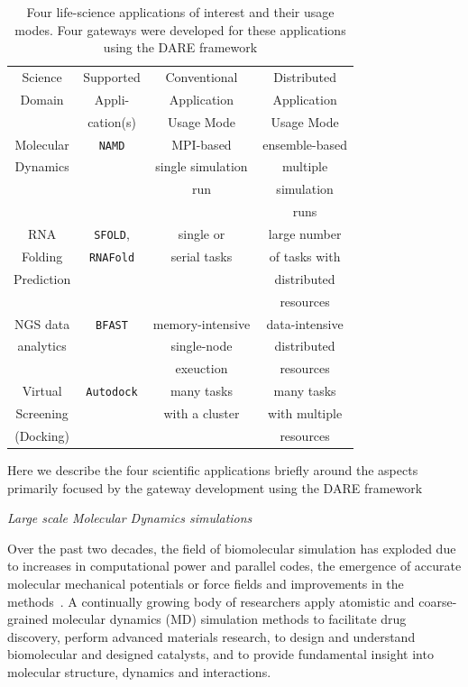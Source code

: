 \documentclass{sig-alternate}
\begin{document}
\begin{table}
 \small
\begin{tabular}{|c|c|c|c|} 
  \hline Science  & Supported  & Conventional   &   Distributed
  \\
  Domain & Appli- & Application & Application \\ 
  &  cation(s) & Usage Mode & Usage Mode \\  \hline \hline 
  
  Molecular   &  \texttt{NAMD} &  MPI-based  & ensemble-based   \\
   Dynamics  &  & single simulation  & multiple  \\ 
   &  & run &  simulation  \\ 
   &  &  &  runs \\ \hline
  RNA   & \texttt{SFOLD}, & single or   & large number  \\
  Folding   & \texttt{RNAFold} & serial tasks & of tasks with   \\
  Prediction & &  &distributed \\
  &  &  &   resources  \\ \hline
  NGS data     &  \texttt{BFAST} & memory-intensive  & data-intensive\\ 
     analytics  &  &  single-node   &  distributed  \\
     & & exeuction  & resources \\ \hline
  Virtual  & \texttt{Autodock} &  many tasks   & many tasks \\
   Screening  &  & with a cluster  & with multiple  \\
    (Docking) &  &  & resources \\ \hline

\hline
\end{tabular} \caption{Four life-science applications of interest and their usage modes.  Four gateways were developed for these applications using the DARE framework}
 \label{table:four-applications} 
\end{table}

Here we describe the four scientific applications briefly around the aspects primarily focused by the gateway development using the DARE framework

\textit{Large scale Molecular Dynamics simulations}

Over the past two decades, the field of biomolecular simulation has
exploded due to increases in computational power and parallel codes,
the emergence of accurate molecular mechanical potentials or force
fields and improvements in the methods~\cite{amber,mackerell2008,adcock2006}. A continually growing body of researchers apply atomistic and coarse-grained molecular dynamics (MD) simulation
methods to facilitate drug discovery, perform advanced materials
research, to design and understand biomolecular and designed
catalysts, and to provide fundamental insight into molecular
structure, dynamics and interactions\cite{meinke2009,mcdowell2006,beck2007}. 
\end{document}
